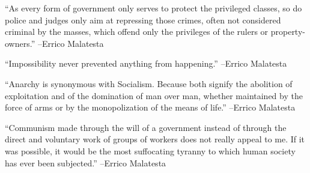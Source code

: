 \documentclass{article}%
\begin{document}
\linebreak%
\vspace{1mm}%
\begin{minipage}{\textwidth}%
\flushleft%
“As every form of government only serves to protect the privileged classes, so do police and judges only aim at repressing those crimes, often not considered criminal by the masses, which offend only the privileges of the rulers or property{-}owners.”%
\linebreak%
\vspace{1mm}%
–Errico Malatesta%
\linebreak%
\vspace{1mm}%
\end{minipage}%
\linebreak%
\vspace{1mm}%
\begin{minipage}{\textwidth}%
\flushleft%
“Impossibility never prevented anything from happening.”%
\linebreak%
\vspace{1mm}%
–Errico Malatesta%
\linebreak%
\vspace{1mm}%
\end{minipage}%
\linebreak%
\vspace{1mm}%
\begin{minipage}{\textwidth}%
\flushleft%
“Anarchy is synonymous with Socialism. Because both signify the abolition of exploitation and of the domination of man over man, whether maintained by the force of arms or by the monopolization of the means of life.”%
\linebreak%
\vspace{1mm}%
–Errico Malatesta%
\linebreak%
\vspace{1mm}%
\end{minipage}%
\linebreak%
\vspace{1mm}%
\begin{minipage}{\textwidth}%
\flushleft%
“Communism made through the will of a government instead of through the direct and voluntary work of groups of workers does not really appeal to me. If it was possible, it would be the most suffocating tyranny to which human society has ever been subjected.”%
\linebreak%
\vspace{1mm}%
–Errico Malatesta%
\linebreak%
\vspace{1mm}%
\end{minipage}%
\end{document}
